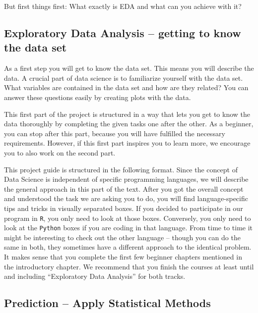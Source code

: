 \documentclass[
  11pt,
]{article}
\begin{document}
But first things first: What exactly is EDA and what can you achieve with it?

\hypertarget{exploratory-data-analysis-getting-to-know-the-data-set}{%
\subsection{Exploratory Data Analysis -- getting to know the data set}\label{exploratory-data-analysis-getting-to-know-the-data-set}}

As a first step you will get to know the data set. This means you will describe the data. A crucial part of data science is to familiarize yourself with the data set. What variables are contained in the data set and how are they related? You can answer these questions easily by creating plots with the data.

This first part of the project is structured in a way that lets you get to know the data thoroughly by completing the given tasks one after the other. As a beginner, you can stop after this part, because you will have fulfilled the necessary requirements. However, if this first part inspires you to learn more, we encourage you to also work on the second part.

This project guide is structured in the following format. Since the concept of Data Science is independent of specific programming languages, we will describe the general approach in this part of the text. After you got the overall concept and understood the task we are asking you to do, you will find language-specific tips and tricks in visually separated boxes. If you decided to participate in our program in \texttt{R}, you only need to look at those boxes. Conversely, you only need to look at the \texttt{Python} boxes if you are coding in that language. From time to time it might be interesting to check out the other language -- though you can do the same in both, they sometimes have a different approach to the identical problem. It makes sense that you complete the first few beginner chapters mentioned in the introductory chapter. We recommend that you finish the courses at least until and including ``Exploratory Data Analysis'' for both tracks.

\hypertarget{prediction-apply-statistical-methods}{%
\subsection{Prediction -- Apply Statistical Methods}\label{prediction-apply-statistical-methods}}
\end{document}
